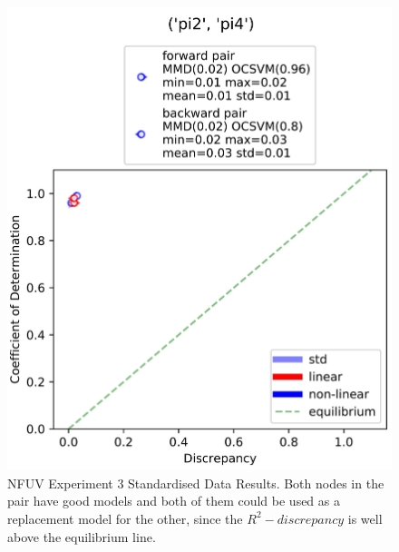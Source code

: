 \documentclass{mpaper}
\begin{document}
\begin{figure}[]
    \centering
    \includegraphics[scale = 0.09]{experiment_3_std.jpg}
    \caption{NFUV Experiment 3 Standardised Data Results. Both nodes in the pair have good models and both of them could be used as a replacement model for the other, since the $R^2 - discrepancy$ is well above the equilibrium line.}
    \label{fig:gnfuv_exp3_std}
\end{figure}




\end{document}

